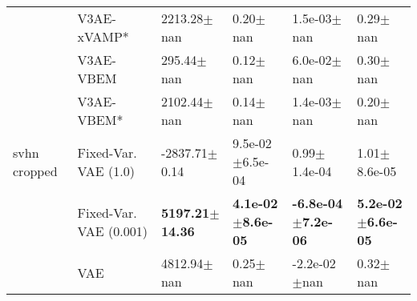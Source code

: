\begin{tabular}{llllll}
             & V3AE-xVAMP* &              2213.28$\pm$nan &                  0.20$\pm$nan &                1.5e-03$\pm$nan &                  0.29$\pm$nan \\
             & V3AE-VBEM &               295.44$\pm$nan &                  0.12$\pm$nan &                6.0e-02$\pm$nan &                  0.30$\pm$nan \\
             & V3AE-VBEM* &              2102.44$\pm$nan &                  0.14$\pm$nan &                1.4e-03$\pm$nan &                  0.20$\pm$nan \\
svhn cropped & Fixed-Var. VAE (1.0) &            -2837.71$\pm$0.14 &           9.5e-02$\pm$6.5e-04 &               0.99$\pm$1.4e-04 &              1.01$\pm$8.6e-05 \\
             & Fixed-Var. VAE (0.001) &   \textbf{5197.21$\pm$14.36} &  \textbf{4.1e-02$\pm$8.6e-05} &  \textbf{-6.8e-04$\pm$7.2e-06} &  \textbf{5.2e-02$\pm$6.6e-05} \\
             & VAE &              4812.94$\pm$nan &                  0.25$\pm$nan &               -2.2e-02$\pm$nan &                  0.32$\pm$nan \\
\bottomrule
\end{tabular}

